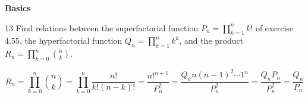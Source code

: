 \documentclass[a4paper,12pt]{article}
\makeatletter
\newtheorem*{solution}{Solution}
\theoremstyle{definition}
\renewenvironment{solution}[1][Solution] {\par\pushQED{\qed}\normalfont\topsep6\p@\@plus6\p@\relax\trivlist\item[\hskip\labelsep\bfseries#1\@addpunct{.}]\ignorespaces}{\popQED\endtrivlist\@endpefalse} \makeatother
\newenvironment{problems}{\begin{list}{}{\renewcommand{\makelabel}[1]{\textbf{##1}\hfil}}}{\end{list}}
\makeatother
\begin{document}
\noindent\textbf{Basics}

\begin{problems}
    \item[13]Find relations between the superfactorial function $P_n=\prod^n_{k=1} k!$ of exercise 4.55, the hyperfactorial function $Q_n=\prod^n_{k=1} k^k$, and the product $R_n=\prod^n_{k=0}\binom{n}{k}$.
    \begin{solution}
        \begin{equation*}
            R_n = \prod^n_{k=0}\binom{n}{k} = \prod^n_{k=0} \frac{n!}{k!(n-k)!} = \frac{n!^{n+1}}{P_n^2} = \frac{Q_n n(n-1)^2\cdots 1^n}{P_n^2} = \frac{Q_n P_n}{P_n^2} = \frac{Q_n}{P_n}
        \end{equation*}
    \end{solution} 
\end{problems}
\end{document}
